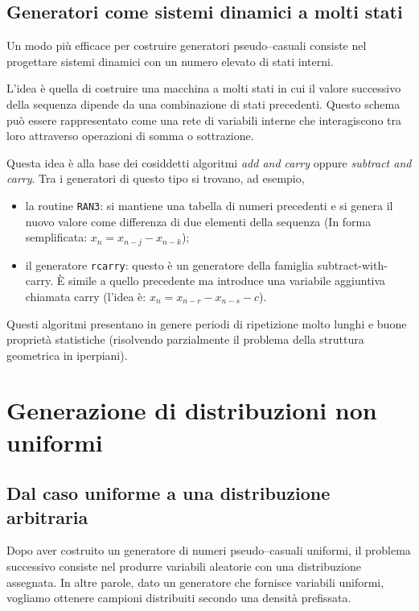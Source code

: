 \vspace{0.5cm}
\subsection{Generatori come sistemi dinamici a molti stati}

Un modo più efficace per costruire generatori pseudo–casuali consiste nel progettare sistemi dinamici con un numero elevato di stati interni.

L'idea è quella di costruire una macchina a molti stati in cui il valore successivo della sequenza dipende da una combinazione di stati precedenti. Questo schema può essere rappresentato come una rete di variabili interne che interagiscono tra loro attraverso operazioni di somma o sottrazione.

Questa idea è alla base dei cosiddetti algoritmi \emph{add and carry} oppure \emph{subtract and carry}. Tra i generatori di questo tipo si trovano, ad esempio,

\begin{itemize}
	\item la routine \texttt{RAN3}: si mantiene una tabella di numeri precedenti e si genera il nuovo valore come differenza di due elementi della sequenza (In forma semplificata: $x_n=x_{n−j}-x_{n−k}$);
	
	\item il generatore \texttt{rcarry}: questo è un generatore della famiglia subtract-with-carry. È simile a quello precedente ma introduce una variabile aggiuntiva chiamata carry (l'idea è: $x_n=x_{n−r}-x_{n−s}-c$).
\end{itemize}

Questi algoritmi presentano in genere periodi di ripetizione molto lunghi e buone proprietà statistiche (risolvendo parzialmente il problema della struttura geometrica in iperpiani).




\section{Generazione di distribuzioni non uniformi}

\subsection{Dal caso uniforme a una distribuzione arbitraria}

Dopo aver costruito un generatore di numeri pseudo--casuali uniformi, il problema successivo consiste nel produrre variabili aleatorie con una distribuzione assegnata. In altre parole, dato un generatore che fornisce variabili uniformi, vogliamo ottenere campioni distribuiti secondo una densità prefissata.

